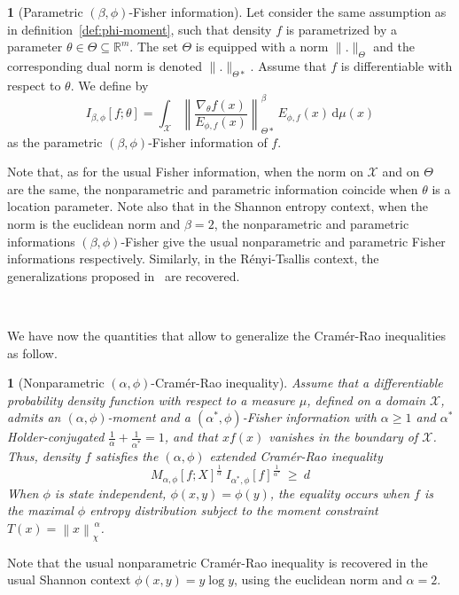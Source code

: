 \documentclass[english,sort&compress]{elsarticle}
\theoremstyle{definition}
\newtheorem{defn}{\protect\definitionname}
\theoremstyle{plain}
\newtheorem{prop}{\protect\propositionname}
\theoremstyle{plain}
\providecommand{\definitionname}{Definition}
\providecommand{\propositionname}{Proposition}
\def\dmu{\mathrm{d}\mu}
\def\Rset{\mathbb{R}}
\def\X{\mathcal{X}}
\begin{document}
\begin{defn}[Parametric $(\beta,\phi)$-Fisher information]\label{def:p-phi-Fisher}
  Let consider  the same assumption as  in definition~\ref{def:phi-moment}, such
  that density $f$  is parametrized by a parameter  $\theta \in \Theta \subseteq
  \Rset^m$.  The set  $\Theta$ is equipped with a  norm $\|.\|_{\Theta}$ and the
  corresponding  dual norm  is denoted  $\|.\|_{\Theta*}$.  Assume  that  $f$ is
  differentiable with respect to $\theta$. We define by
  \begin{equation}\label{eq:p-phi-Fisher}
  I_{\beta,\phi}[f;\theta] = \int_\X \left\| \frac{\nabla_\theta
  f(x)}{E_{\phi,f}(x)} \right\|_{\Theta*}^\beta \, E_{\phi,f}(x) \, \dmu(x)
  \end{equation}
  as the parametric $(\beta,\phi)$-Fisher information of $f$.
\end{defn}
%
Note that,  as for the usual  Fisher information, when  the norm on $\X$  and on
$\Theta$  are the same,  the nonparametric  and parametric  information coincide
when $\theta$  is a location  parameter. Note also  that in the  Shannon entropy
context, when the norm is the  euclidean norm and $\beta = 2$, the nonparametric
and parametric  informations $(\beta,\phi)$-Fisher give  the usual nonparametric
and   parametric   Fisher   informations   respectively.   Similarly,   in   the
R\'enyi-Tsallis  context,   the  generalizations  proposed  in~\cite{Ber12:06_1,
  Ber12:06_2, Ber13} are recovered.

\

We  have  now   the  quantities  that  allow  to   generalize  the  Cram\'er-Rao
inequalities as follow.
%
\begin{prop}[Nonparametric                           $(\alpha,\phi)$-Cram\'er-Rao
  inequality]\label{prop:np-phi-CR}
  Assume that  a differentiable probability  density function with respect  to a
  measure $\mu$, defined on a  domain $\X$, admits an $(\alpha,\phi)$-moment and
  a  $(\alpha^*,\phi)$-Fisher information  with  $\alpha \ge  1$ and  $\alpha^*$
  Holder-conjugated  $\frac{1}{\alpha} +  \frac{1}{\alpha^*} =  1$, and  that $x
  f(x)$  vanishes in  the boundary  of $\X$.   Thus, density  $f$  satisfies the
  $(\alpha,\phi)$ extended Cram\'er-Rao inequality
  \begin{equation}\label{eq:np-phi-CR}
   M_{\alpha,\phi}[f;X]^{\frac{1}{\alpha}} \: I_{\alpha^*\!,\phi}[f]^{\frac{1}{\alpha^*}}
   \: \ge \: d
  \end{equation}
  When $\phi$ is  state independent, $\phi(x,y) = \phi(y)$,  the equality occurs
  when  $f$ is the  maximal $\phi$  entropy distribution  subject to  the moment
  constraint $T(x) = \left\| x \right\|_{\chi}^{\, \alpha}$.
\end{prop}
%
Note that  the usual nonparametric  Cram\'er-Rao inequality is recovered  in the
usual Shannon  context $\phi(x,y)  = y  \log y$, using  the euclidean  norm and
$\alpha = 2$.
\end{document}
